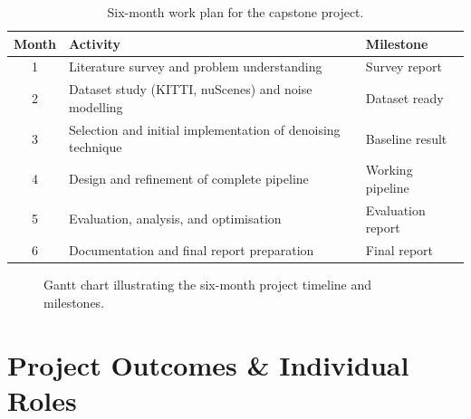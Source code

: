 \documentclass[12pt,a4paper]{article}
\begin{document}
\begin{table}[h]
\centering
\caption{Six-month work plan for the capstone project.}
\label{tab:workplan}
\renewcommand{\arraystretch}{1.4}
\begin{tabular}{|c|p{8.2cm}|p{3.2cm}|}
\hline
\textbf{Month} & \textbf{Activity} & \textbf{Milestone}\\\hline
1 & Literature survey and problem understanding & Survey report\\\hline
2 & Dataset study (KITTI, nuScenes) and noise modelling & Dataset ready\\\hline
3 & Selection and initial implementation of denoising technique & Baseline result\\\hline
4 & Design and refinement of complete pipeline & Working pipeline\\\hline
5 & Evaluation, analysis, and optimisation & Evaluation report\\\hline
6 & Documentation and final report preparation & Final report\\\hline
\end{tabular}
\end{table}

\begin{figure}[h]
\centering
{}
\caption{Gantt chart illustrating the six-month project timeline and milestones.}
\label{fig:gantt}
\end{figure}
\clearpage

\section{Project Outcomes \& Individual Roles}
\end{document}
